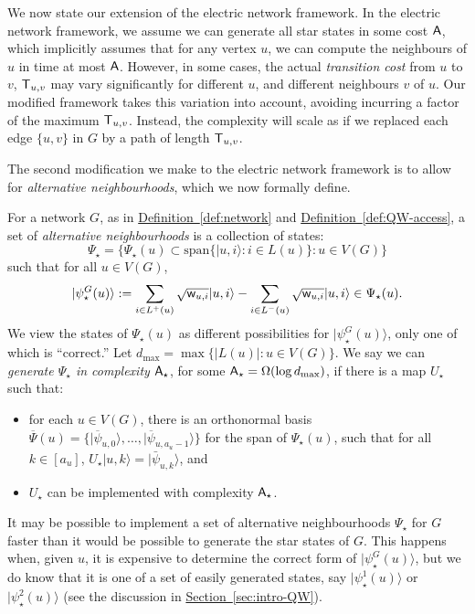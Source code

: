 \documentclass{article}
\renewcommand{\sec}[1]{\hyperref[sec:#1]{Section~\ref*{sec:#1}}}
\newcommand{\defin}[1]{\hyperref[def:#1]{Definition~\ref*{def:#1}}}
\def\ket#1{{\lvert}#1\rangle}
\renewcommand{\>}{\rangle}
\newcommand{\<}{\langle}
\renewcommand{\(}{\left(}
\renewcommand{\)}{\right)}
\def\w{{\sf w}}
\begin{document}
We now state our extension of the electric network framework. 
In the electric network framework, we assume we can generate all star states in some cost ${\sf A}$, which implicitly assumes that for any vertex $u$, we can compute the neighbours of $u$ in time at most ${\sf A}$. However, in some cases, the actual \emph{transition cost} from $u$ to $v$, ${\sf T}_{u,v}$ may vary significantly for different $u$, and different neighbours $v$ of $u$. Our modified framework takes this variation into account, avoiding incurring a factor of the maximum ${\sf T}_{u,v}$. Instead, the complexity will scale as if we replaced each edge $\{u,v\}$ in $G$ by a path of length ${\sf T}_{u,v}$. 

The second modification we make to the electric network framework is to allow for \emph{alternative neighbourhoods}, which we now formally define.

\begin{definition}\label{def:alternative}
For a network $G$, as in \defin{network} and \defin{QW-access}, a set of \emph{alternative neighbourhoods} is a collection of states:
$$\Psi_\star=\{\Psi_\star(u)\subset\mathrm{span}\{\ket{u,i}:i\in L(u)\}: u\in V(G)\}$$
such that for all $u\in V(G)$, 
$$\ket{\psi_\star^G(u)}:=\sum_{i\in L^+(u)}\sqrt{\w_{u,i}}\ket{u,i}-\sum_{i\in L^-(u)}\sqrt{\w_{u,i}}\ket{u,i}\in \Psi_\star(u).$$ 
We view the states of $\Psi_\star(u)$ as different possibilities for $\ket{\psi_\star^G(u)}$, only one of which is ``correct.'' Let $d_{\max}=\max\{|L(u)|:u\in V(G)\}$. We say we can \emph{generate $\Psi_\star$ in complexity ${\sf A}_\star$}, for some ${\sf A}_{\star}=\Omega(\log d_{\max})$, if there is a map $U_\star$ such that:
\begin{itemize} 
\item for each $u\in V(G)$, there is an orthonormal basis $\overline{\Psi}(u)=\{\ket{\overline{\psi}_{u,0}},\dots,\ket{\overline{\psi}_{u,a_u-1}}\}$ for the span of $\Psi_\star(u)$, such that for all $k\in [a_u]$,
$U_{\star}\ket{u,k}=\ket{\bar\psi_{u,k}}$, and 
\item $U_\star$ can be implemented with complexity ${\sf A}_\star$.
\end{itemize}
\end{definition}

It may be possible to implement a set of alternative neighbourhoods $\Psi_\star$ for $G$ faster than it would be possible to generate the star states of $G$. This happens when, given $u$, it is expensive to determine the correct form of $\ket{\psi_\star^G(u)}$, but we do know that it is one of a set of easily generated states, say $\ket{\psi_\star^1(u)}$ or $\ket{\psi_\star^2(u)}$ (see the discussion in \sec{intro-QW}). 
\end{document}
